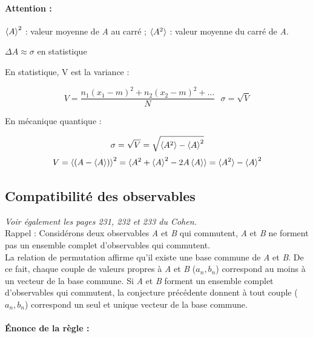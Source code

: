 \documentclass[12pt,a4paper,titlepage]{book}
\begin{document}
\paragraph*{Attention :}

$\braket{A}^2$ : valeur moyenne de \textit{A} au carré ; $\braket{A^2}$ : valeur moyenne du carré de \textit{A}.\\
\begin{center}
$\Delta A \approx \sigma$ en statistique
\end{center}

En statistique, V est la variance :

\begin{equation*}
V = \frac{n_1 (x_1 - m)^2 + n_2 (x_2 - m)^2 + \ldots}{N} ~~~ \sigma = \sqrt{V}
\end{equation*}

En mécanique quantique :

\begin{equation*}
\sigma = \sqrt{V} = \sqrt{\braket{A^2} - \braket{A}^2}
\end{equation*}
\begin{equation*}
V = \braket{(A - \braket{A})}^2 = \braket{A^2 + \braket{A}^2 - 2A \braket{A}} = \braket{A^2} - \braket{A}^2 
\end{equation*}

\subsection{Compatibilité des observables}

\textit{Voir également les pages 231, 232 et 233 du Cohen.}\\

Rappel : Considérons deux observables \textit{A} et \textit{B} qui commutent, \textit{A} et \textit{B} ne forment pas un ensemble complet d'observables qui commutent.\\

La relation de permutation affirme qu'il existe une base commune de \textit{A} et \textit{B}. De ce fait, chaque couple de valeurs propres à \textit{A} et \textit{B} ($a_n , b_n$) correspond au moins à un vecteur de la base commune. Si \textit{A} et \textit{B} forment un ensemble complet d'observables qui commutent, la conjecture précédente donnent à tout couple ($a_n , b_n$) correspond un seul et unique vecteur de la base commune.

\paragraph*{Énonce de la règle :}
\end{document}
